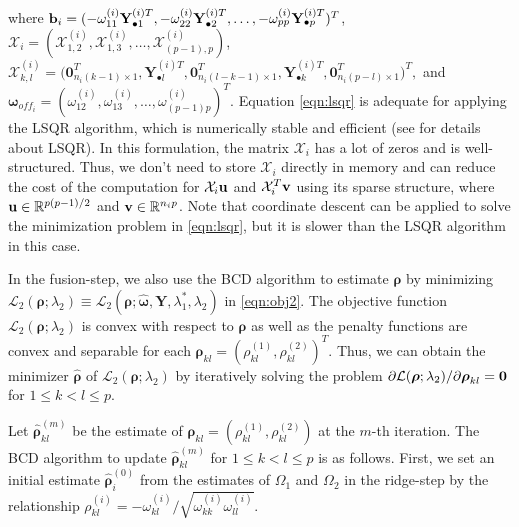 \documentclass[useAMS,usenatbib,referee]{bio}
\newcommand{\bs}{\boldsymbol}
\begin{document}
{where ${\bf b}_i = ( -\omega^{(i)}_{11} {\bf Y}_{\bullet 1}^{(i)T}, -\omega^{(i)}_{22} {\bf Y}_{\bullet 2}^{(i)T}, \ldots, -\omega^{(i)}_{pp} {\bf Y}_{\bullet p}^{(i)T})^T$,
${\mathcal X}_i = ({\mathcal X}^{(i)}_{1,2}, {\mathcal X}^{(i)}_{1,3}, \ldots, {\mathcal  X}^{(i)}_{(p-1),p})$,
$
\mathcal{X}^{(i)}_{k,l}
= \big( \mathbf{0}_{n_i(k-1)\times 1}^{ T},
\mathbf{Y}_{\bullet l}^{(i)T}, \mathbf{0}_{n_i(l-k-1)\times 1}^T
, \mathbf{Y}_{\bullet k}^{(i)T}, \mathbf{0}_{n_i(p-l)\times 1}^T
\big)^T,
$   
and
$\bs{\omega}_{off_i} = (\omega^{(i)}_{12}, \omega^{(i)}_{13},\ldots,\omega^{(i)}_{(p-1)p})^T$.
Equation \eqref{eqn:lsqr} is adequate for applying the LSQR algorithm, which is numerically stable and efficient (see \cite{Paige:1982} for details about LSQR). 
In this formulation, the matrix ${\mathcal X}_i$ has a lot of zeros and is well-structured.
Thus, we don't need to store ${\mathcal X}_i$ directly in memory and can reduce the cost of the computation for ${\mathcal X}_i {\bf u}$ and ${\mathcal X}_i^T {\bf v}$ using its sparse structure, 
where ${\bf u} \in \mathbb{R}^{p(p-1)/2}$ and ${\bf v} \in \mathbb{R}^{n_i p}$.
Note that coordinate descent can be applied to solve the minimization problem in \eqref{eqn:lsqr}, but it is slower than the LSQR algorithm in this case.


In the fusion-step, we also use the BCD algorithm to estimate ${\bs{\rho}}$ by minimizing
${\mathcal L}_2(\bs{\rho};\lambda_2)\equiv {\mathcal L}_2(\bs{\rho};\hat{\bs{\omega}},\mathbf{Y},\lambda_1^*,\lambda_2)$ in \eqref{eqn:obj2}. The objective function ${\mathcal L}_2(\bs{\rho};\lambda_2)$ is convex with respect to $\bs{\rho}$ as well as the penalty functions are convex and separable for each $\bs{\rho}_{kl} = (\rho^{(1)}_{kl}, \rho^{(2)}_{kl})^T$. Thus, we can obtain the minimizer $\hat{\bs{\rho}}$ of ${\mathcal L}_2(\bs{\rho};\lambda_2)$ by iteratively solving the problem $\partial {\mathcal L}(\bs{\rho};\lambda_2) / \partial \bs{\rho}_{kl} = {\bf 0}$ for $1 \leq k <l \leq p $.


Let $\widehat{\bs{\rho}}_{kl}^{(m)}$ be the estimate of $\bs{\rho}_{kl}=(\rho_{kl}^{(1)},\rho_{kl}^{(2)})$ at the $m$-th iteration.
The BCD algorithm to update $\widehat{\bs{\rho}}_{kl}^{(m)}$ for $1\le k<l \le p$ is as follows. 
First, we set an initial estimate $\widehat{\bs{\rho}}_i^{(0)}$ from the estimates of $\Omega_1$ and $\Omega_2$ in the ridge-step by the relationship $\rho^{(i)}_{kl} = -\omega^{(i)}_{kl}/\sqrt{\omega^{(i)}_{kk} \omega^{(i)}_{ll}}$.


}
\end{document}
